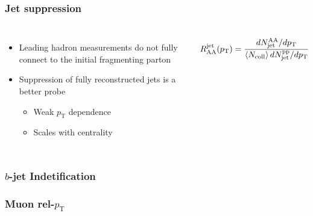 \documentclass[9pt]{beamer}
\begin{document}
     \begin{frame}
       \frametitle{\textbf{Jet suppression}}
       \begin{columns}
         \begin{itemize}
         \item Leading hadron measurements do not fully connect to the initial fragmenting parton
         \item Suppression of fully reconstructed jets is a better probe
           \begin{itemize}
           \item Weak $p_{\text{T}}$ dependence
           \item Scales with centrality
           \end{itemize}
         \end{itemize}
         \begin{align*}
           R_{\text{AA}}^{\text{jet}} (p_{\text{T}}) = \cfrac{dN^{\text{AA}}_{\text{jet}} / dp_{\text{T}}}{\left< N_{\text{coll}} \right> dN^{\text{pp}}_{\text{jet}} / dp_{\text{T}}}
         \end{align*}
       \end{columns}
       \begin{columns}
       \end{columns}
     \end{frame}

     \begin{frame}
       \frametitle{\textbf{$b$-jet Indetification}}
     \end{frame}

     \begin{frame}
       \frametitle{\textbf{Muon rel-$p_{\text{T}}$}}
     \end{frame}
\end{document}
